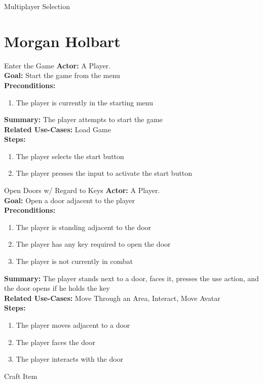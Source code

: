 \documentclass[12pt]{report}
\begin{document}
\begin{subsection}{Multiplayer Selection}
\section{Morgan Holbart}
\begin{subsection}{Enter the Game}
\textbf{Actor:} A Player. \\
\textbf{Goal:} Start the game from the menu \\
\textbf{Preconditions:}
\begin{enumerate}
	\item The player is currently in the starting menu
\end{enumerate}
\textbf{Summary:} The player attempts to start the game \\
\textbf{Related Use-Cases:} Load Game \\
\textbf{Steps:}
\begin{enumerate}
	\item The player selects the start button
	\item The player presses the input to activate the start button
\end{enumerate}
\end{subsection}
\begin{subsection}{Open Doors w/ Regard to Keys}
\textbf{Actor:} A Player. \\
\textbf{Goal:} Open a door adjacent to the player \\
\textbf{Preconditions:}
\begin{enumerate}
	\item The player is standing adjacent to the door
	\item The player has any key required to open the door
	\item The player is not currently in combat
\end{enumerate}
\textbf{Summary:} The player stands next to a door, faces it, presses the use action, and the door opens if he holds the key \\
\textbf{Related Use-Cases:} Move Through an Area, Interact, Move Avatar \\
\textbf{Steps:}
\begin{enumerate}
	\item The player moves adjacent to a door
	\item The player faces the door
	\item The player interacts with the door
\end{enumerate}
\end{subsection}
\begin{subsection}{Craft Item}

\end{subsection}
\end{subsection}
\end{document}
